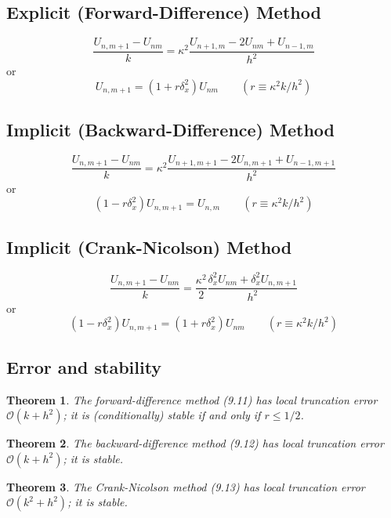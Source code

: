 \documentclass[11pt]{book}
\theoremstyle{example}
\theoremstyle{problem}
\theoremstyle{theorem}
\newtheorem{theorem}{Theorem}[chapter]
\theoremstyle{definition}
\begin{document}
\subsection{Explicit (Forward-Difference) Method}
\begin{equation}
	\frac{U_{n,m+1}-U_{nm}}{k}=\kappa^2\frac{U_{n+1,m}-2U_{nm}+U_{n-1,m}}{h^2}
\end{equation}
or
\begin{equation}
	U_{n,m+1}=(1+r\delta_x^2)U_{nm}\qquad(r\equiv\kappa^2k/h^2)
\end{equation}
\subsection{Implicit (Backward-Difference) Method}
\begin{equation}
	\frac{U_{n,m+1}-U_{nm}}{k}=\kappa^2\frac{U_{n+1,m+1}-2U_{n,m+1}+U_{n-1,m+1}}{h^2}
\end{equation}
or
\begin{equation}
	(1-r\delta_x^2)U_{n,m+1}=U_{n,m}\qquad(r\equiv\kappa^2k/h^2)
\end{equation}
\subsection{Implicit (Crank-Nicolson) Method}
\begin{equation}
	\frac{U_{n,m+1}-U_{nm}}{k}=\frac{\kappa^2}{2}\frac{\delta_x^2U_{nm}+\delta_x^2U_{n,m+1}}{h^2}
\end{equation}
or
\begin{equation}
	(1-r\delta_x^2)U_{n,m+1}=(1+r\delta_x^2)U_{nm}\qquad(r\equiv\kappa^2k/h^2)
\end{equation}
\subsection{Error and stability}
\begin{theorem}
	The forward-difference method (9.11) has local truncation error $\mathcal{O}(k+h^2)$; it is (conditionally) stable if and only if $r\leq1/2$.
\end{theorem}
\begin{theorem}
	The backward-difference method (9.12) has local truncation error $\mathcal{O}(k+h^2)$; it is stable.
\end{theorem}
\begin{theorem}
	The Crank-Nicolson method (9.13) has local truncation error $\mathcal{O}(k^2+h^2)$; it is stable.
\end{theorem}
\end{document}
